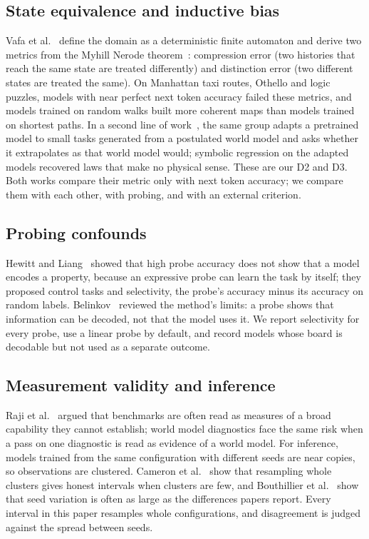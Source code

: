 \documentclass[journal]{IEEEtran}
\begin{document}
\subsection{State equivalence and inductive bias}
Vafa et al.~\cite{vafa2024evaluating} define the domain as a deterministic finite automaton and derive two metrics
from the Myhill Nerode theorem~\cite{nerode1958linear}: compression error (two histories that reach the same state
are treated differently) and distinction error (two different states are treated the same). On Manhattan taxi
routes, Othello and logic puzzles, models with near perfect next token accuracy failed these metrics, and models
trained on random walks built more coherent maps than models trained on shortest paths. In a second line of
work~\cite{vafa2025inductive}, the same group adapts a pretrained model to small tasks generated from a postulated
world model and asks whether it extrapolates as that world model would; symbolic regression on the adapted models
recovered laws that make no physical sense. These are our D2 and D3. Both works compare their metric only with next
token accuracy; we compare them with each other, with probing, and with an external criterion.

\subsection{Probing confounds}
Hewitt and Liang~\cite{hewitt2019control} showed that high probe accuracy does not show that a model encodes a
property, because an expressive probe can learn the task by itself; they proposed control tasks and selectivity,
the probe's accuracy minus its accuracy on random labels. Belinkov~\cite{belinkov2022probing} reviewed the
method's limits: a probe shows that information can be decoded, not that the model uses it. We report selectivity
for every probe, use a linear probe by default, and record models whose board is decodable but not used as a
separate outcome.

\subsection{Measurement validity and inference}
Raji et al.~\cite{raji2021benchmark} argued that benchmarks are often read as measures of a broad capability they
cannot establish; world model diagnostics face the same risk when a pass on one diagnostic is read as evidence of a
world model. For inference, models trained from the same configuration with different seeds are near copies, so
observations are clustered. Cameron et al.~\cite{cameron2008bootstrap} show that resampling whole clusters gives
honest intervals when clusters are few, and Bouthillier et al.~\cite{bouthillier2021variance} show that seed
variation is often as large as the differences papers report. Every interval in this paper resamples whole
configurations, and disagreement is judged against the spread between seeds.
\end{document}
